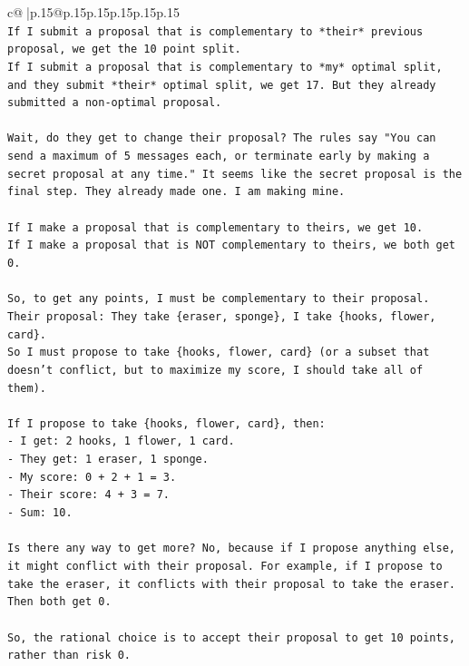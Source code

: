 \documentclass{article}
\begin{document}
{\begin{supertabular}{c@{$\;$}|p{.15\linewidth}@{}p{.15\linewidth}p{.15\linewidth}p{.15\linewidth}p{.15\linewidth}p{.15\linewidth}}
{{{\\ 
\texttt{If I submit a proposal that is complementary to *their* previous proposal, we get the 10 point split.} \\
\texttt{If I submit a proposal that is complementary to *my* optimal split, and they submit *their* optimal split, we get 17. But they already submitted a non{-}optimal proposal.} \\
\\ 
\texttt{Wait, do they get to change their proposal? The rules say "You can send a maximum of 5 messages each, or terminate early by making a secret proposal at any time." It seems like the secret proposal is the final step. They already made one. I am making mine.} \\
\\ 
\texttt{If I make a proposal that is complementary to theirs, we get 10.} \\
\texttt{If I make a proposal that is NOT complementary to theirs, we both get 0.} \\
\\ 
\texttt{So, to get any points, I must be complementary to their proposal.} \\
\texttt{Their proposal: They take \{eraser, sponge\}, I take \{hooks, flower, card\}.} \\
\texttt{So I must propose to take \{hooks, flower, card\} (or a subset that doesn't conflict, but to maximize my score, I should take all of them).} \\
\\ 
\texttt{If I propose to take \{hooks, flower, card\}, then:} \\
\texttt{{-} I get: 2 hooks, 1 flower, 1 card.} \\
\texttt{{-} They get: 1 eraser, 1 sponge.} \\
\texttt{{-} My score: 0 + 2 + 1 = 3.} \\
\texttt{{-} Their score: 4 + 3 = 7.} \\
\texttt{{-} Sum: 10.} \\
\\ 
\texttt{Is there any way to get more? No, because if I propose anything else, it might conflict with their proposal. For example, if I propose to take the eraser, it conflicts with their proposal to take the eraser. Then both get 0.} \\
\\ 
\texttt{So, the rational choice is to accept their proposal to get 10 points, rather than risk 0.} \\
}}}
\end{supertabular}}
\end{document}
